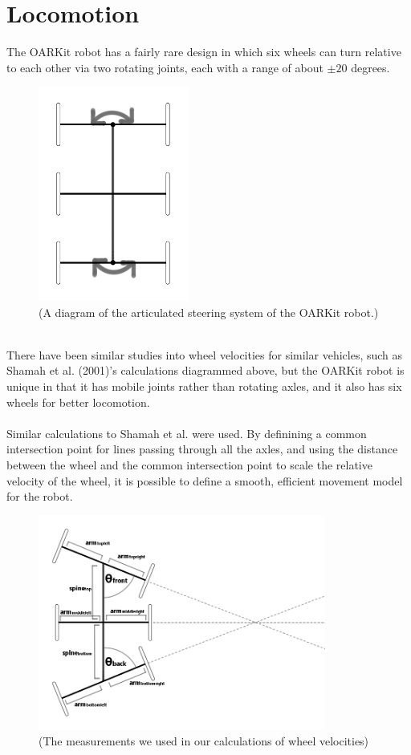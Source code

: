 \documentclass[]{article}
\begin{document}
\section{Locomotion}
The OARKit robot has a fairly rare design in which six wheels can turn relative to each other via two rotating joints, each with a range of about $\pm20$ degrees.
\\
\begin{figure}[ht]
    \includegraphics[height = 200pt]{report_images/diagram1.png}
    \caption{(A diagram of the articulated steering system of the OARKit robot.)}
    \label{fig:diagram1}
\end{figure}
\\
There have been similar studies into wheel velocities for similar vehicles, such as Shamah et al. (2001)'s calculations diagrammed above, but the OARKit robot is unique in that it has mobile joints rather than rotating axles, and it also has six wheels for better locomotion.
\\
\\
Similar calculations to Shamah et al. were used. By definining a common intersection point for lines passing through all the axles, and using the distance between the wheel and the common intersection point to scale the relative velocity of the wheel, it is possible to define a smooth, efficient movement model for the robot.
\\
\begin{figure}[ht]
    \includegraphics[height = 200pt]{report_images/diagram2.png}
    \caption{(The measurements we used in our calculations of wheel velocities)}
    \label{fig:diagram2}
\end{figure}
\end{document}
